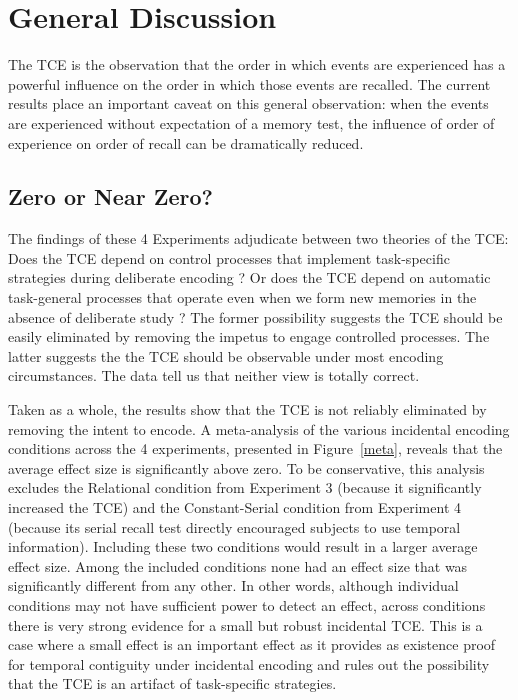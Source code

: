 \documentclass[man,natbib,floatsintext]{apa6} %
\begin{document}
\section{General Discussion}
\color{red}
The TCE is the observation that the order in which events are experienced has a powerful influence on the order in which those events are recalled. The current results place an important caveat on this general observation: when the events are experienced without expectation of a memory test, the influence of order of experience on order of recall can be dramatically reduced.  

\label{zerovsnear}
\subsection{Zero or Near Zero?}
The findings of these 4 Experiments adjudicate between two theories of the TCE: Does the TCE depend on control processes that implement task-specific strategies during deliberate encoding \citep{Hint16}? Or does the TCE depend on automatic task-general processes that operate even when we form new memories in the absence of deliberate study \citep{HealKaha17}? The former possibility suggests the TCE should be easily eliminated by removing the impetus to engage controlled processes. The latter suggests the the TCE should be observable under most encoding circumstances. The data tell us that neither view is totally correct.

Taken as a whole, the results show that the TCE is not reliably eliminated by removing the intent to encode. A meta-analysis of the various incidental encoding conditions across the 4 experiments, presented in Figure~\ref{meta}, reveals that the average effect size is significantly above zero. To be conservative, this analysis excludes the Relational condition from Experiment 3 (because it significantly increased the TCE) and the Constant-Serial condition from Experiment 4 (because its serial recall test directly encouraged subjects to use temporal information). Including these two conditions would result in a larger average effect size. Among the included conditions none had an effect size that was significantly different from any other. In other words, although individual conditions may not have sufficient power to detect an effect, across conditions there is very strong evidence for a small but robust incidental TCE. This is a case where a small effect is an important effect as it provides as existence proof for temporal contiguity under incidental encoding and rules out the possibility that the TCE is an artifact of task-specific strategies. 
\end{document}
